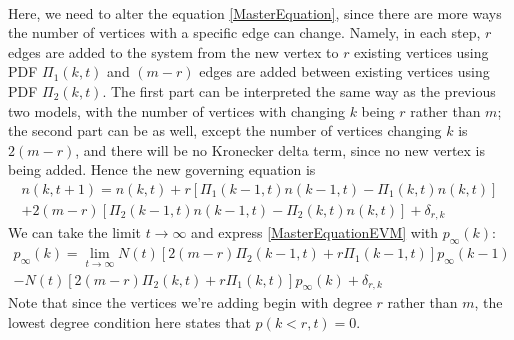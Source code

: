 \documentclass[a4paper,12pt]{article}
\begin{document}
\hfill\\
Here, we need to alter the equation \ref{MasterEquation}, since there are more ways the number of vertices with a specific edge can change. Namely, in each step, $r$ edges are added to the system from the new vertex to $r$ existing vertices using PDF $\Pi_1(k,t)$ and $(m-r)$ edges are added between existing vertices using PDF $\Pi_2(k,t)$. The first part can be interpreted the same way as the previous two models, with the number of vertices with changing $k$ being $r$ rather than $m$; the second part can be as well, except the number of vertices changing $k$ is $2(m-r)$, and there will be no Kronecker delta term, since no new vertex is being added. Hence the new governing equation is
\begin{multline} \label{MasterEquationEVM}
n(k,t+1)= n(k,t)+r\left[\Pi_1(k-1,t)n(k-1,t)-\Pi_1(k,t)n(k,t)\right] \\
+2(m-r)\left[\Pi_2(k-1,t)n(k-1,t)-\Pi_2(k,t)n(k,t)\right]+\delta_{r,k}
\end{multline}
We can take the limit $t\to\infty$ and express \ref{MasterEquationEVM} with $p_\infty(k)$:
\begin{multline} \label{MasterEquationEVMlimit}
p_\infty(k)=\lim_{t\to\infty}N(t)\left[2(m-r)\Pi_2(k-1,t)+r\Pi_1(k-1,t)\right]p_\infty(k-1)\\
-N(t)\left[2(m-r)\Pi_2(k,t)+r\Pi_1(k,t)\right]p_\infty(k)+\delta_{r,k}
\end{multline}
Note that since the vertices we're adding begin with degree $r$ rather than $m$, the lowest degree condition here states that $p(k<r,t)=0$.
\end{document}
